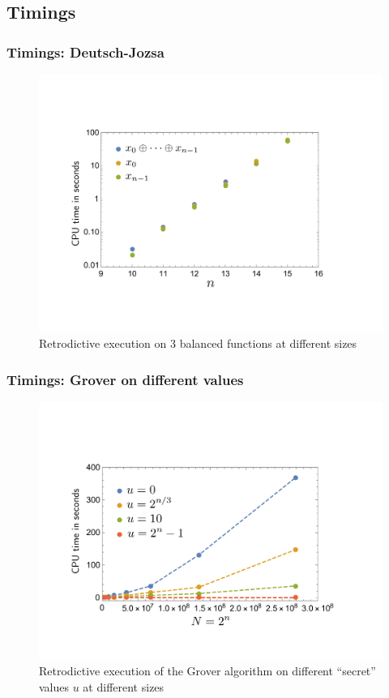 \documentclass{beamer}
\begin{document}
\subsection[Timings]{Timings}
\begin{frame}
  \frametitle{Timings: Deutsch-Jozsa}
  \begin{figure}
 \includegraphics[scale=0.30]{../../pepm/Figure12.pdf}
 \caption{Retrodictive execution on $3$ balanced functions at different sizes}
\end{figure}
\end{frame}

\begin{frame}
  \frametitle{Timings: Grover on different values}
\begin{figure}
\includegraphics[scale=0.29]{../../pepm/Figure13.pdf}
\caption{Retrodictive
  execution of the Grover algorithm on different ``secret'' values $u$
  at different sizes}
\end{figure}
\end{frame}
\end{document}
